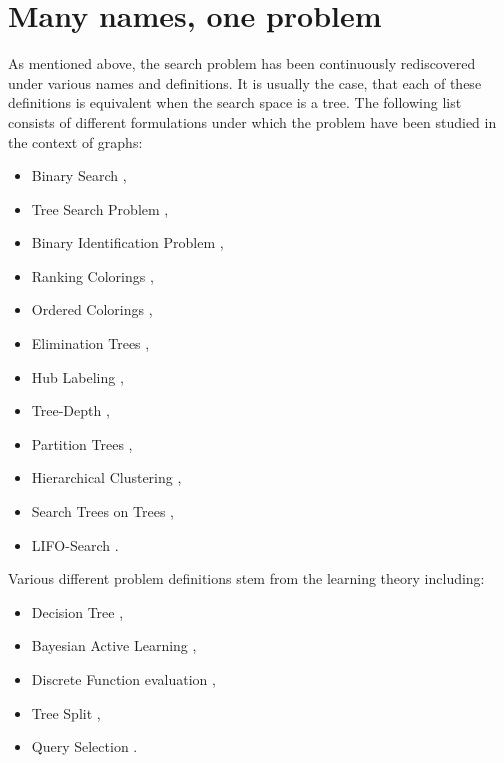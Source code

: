 \section{Many names, one problem}

As mentioned above, the search problem has been continuously rediscovered under various names and definitions. It is usually the case, that each of these definitions is equivalent when the search space is a tree. The following list consists of different formulations under which the problem have been studied in the context of graphs: 
\begin{itemize}
    \item Binary Search \cite{OnakParys2006GenOfBSSInTsAndFLikePosets, dereniowski2017ApproxSsForGeneralBSinWTs, Deligkas2019BsInGsRev, Emamjomeh2016DetAndProbBSinGs, dereniowski2022CFApproxAlgForBSInTsWithMonoQTimes, dereniowski2024SInTsMonoQTs, noisyBSSFC, Dereniowski2024OnMG, EfficientNoisyBinarySearch, Dereniowski2023Edge},
    \item Tree Search Problem \cite{Jacobs2010OnTheComplexSearchInTsAvg, Cicalese2014ImprovedApproxAvgTs, Cicalese2016OnTSPwNonUniCost}, 
    \item Binary Identification Problem \cite{Cicalese2012BinIdentPForWTs, Karbasi2013Constrained}, 
    \item Ranking Colorings \cite{Knuth1973, Dereniowski2009ERankOfWTs, DereniowskiERAndSInPOSets, DereniowskiEfPQProcByGRank, DereniowskiVxRankOfChGsAndWTs, Lam1998ERankOfGsIsH}, 
    \item Ordered Colorings \cite{KATCHALSKI1995141}, 
    \item Elimination Trees \cite{Pothen1988OptimalEliminationTrees}, 
    \item Hub Labeling \cite{Angelidakis2018ShortestPQ},
    \item Tree-Depth \cite{NESETRIL20061022, BOROWIECKI2023113682},
    \item Partition Trees \cite{OnDasHC, Hgemo2024TightAB},
    \item Hierarchical Clustering \cite{Approximatehierarchicalclusteringviasparsestcutandspreadingmetrics}, 
    \item Search Trees on Trees \cite{SplayTonT, Fast_app_centroid_trees}, 
    \item LIFO-Search \cite{GIANNOPOULOU20122089}. 
\end{itemize}
Various different problem definitions stem from the learning theory including:
\begin{itemize}
    \item Decision Tree \cite{LABER2004209,ATightAnalysisofGreedy, GuptasApproxAlgsForOptDTsAndAdaptTSPPs, Tradingoff},
    \item Bayesian Active Learning \cite{NearoptimalBayesianactivelearning,Analysisofgreedyactivelearningstrategy},
    \item Discrete Function evaluation \cite{Diagnosisdetermination},
    \item Tree Split \cite{OnanOptimalSplitTreeProblem},
    \item Query Selection \cite{QuerySelection}.
\end{itemize}

